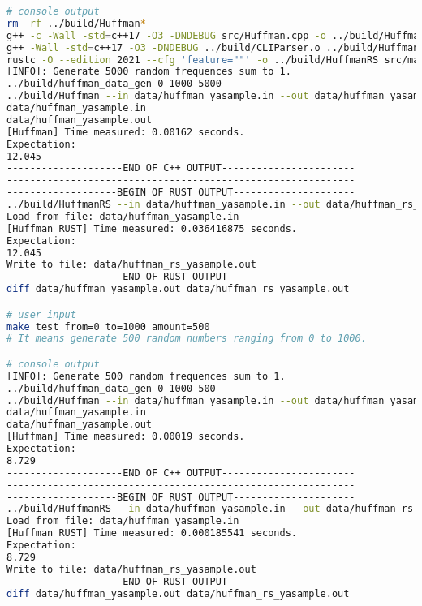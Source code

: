 \begin{lstlisting}[language=bash]
# console output
rm -rf ../build/Huffman*
g++ -c -Wall -std=c++17 -O3 -DNDEBUG src/Huffman.cpp -o ../build/Huffman.o
g++ -Wall -std=c++17 -O3 -DNDEBUG ../build/CLIParser.o ../build/Huffman.o -o ../build/Huffman
rustc -O --edition 2021 --cfg 'feature=""' -o ../build/HuffmanRS src/main.rs
[INFO]: Generate 5000 random frequences sum to 1.
../build/huffman_data_gen 0 1000 5000
../build/Huffman --in data/huffman_yasample.in --out data/huffman_yasample.out
data/huffman_yasample.in
data/huffman_yasample.out
[Huffman] Time measured: 0.00162 seconds.
Expectation:
12.045
--------------------END OF C++ OUTPUT-----------------------
------------------------------------------------------------
-------------------BEGIN OF RUST OUTPUT---------------------
../build/HuffmanRS --in data/huffman_yasample.in --out data/huffman_rs_yasample.out
Load from file: data/huffman_yasample.in
[Huffman RUST] Time measured: 0.036416875 seconds.
Expectation:
12.045
Write to file: data/huffman_rs_yasample.out
--------------------END OF RUST OUTPUT----------------------
diff data/huffman_yasample.out data/huffman_rs_yasample.out

# user input
make test from=0 to=1000 amount=500
# It means generate 500 random numbers ranging from 0 to 1000.

# console output
[INFO]: Generate 500 random frequences sum to 1.
../build/huffman_data_gen 0 1000 500
../build/Huffman --in data/huffman_yasample.in --out data/huffman_yasample.out
data/huffman_yasample.in
data/huffman_yasample.out
[Huffman] Time measured: 0.00019 seconds.
Expectation:
8.729
--------------------END OF C++ OUTPUT-----------------------
------------------------------------------------------------
-------------------BEGIN OF RUST OUTPUT---------------------
../build/HuffmanRS --in data/huffman_yasample.in --out data/huffman_rs_yasample.out
Load from file: data/huffman_yasample.in
[Huffman RUST] Time measured: 0.000185541 seconds.
Expectation:
8.729
Write to file: data/huffman_rs_yasample.out
--------------------END OF RUST OUTPUT----------------------
diff data/huffman_yasample.out data/huffman_rs_yasample.out

\end{lstlisting}
